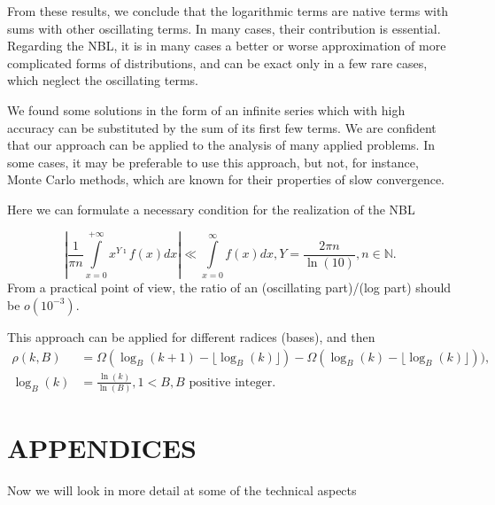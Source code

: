 \documentclass[titlepage,fleqn]{article}%
\providecommand{\U}[1]{\protect\rule{.1in}{.1in}}
\begin{document}
From these results, we conclude that the logarithmic terms are native terms
with sums with other oscillating terms. In many cases, their contribution is
essential. Regarding the NBL, it is in many cases a better or worse
approximation of more complicated forms of distributions, and can be exact
only in a few rare cases, which neglect the oscillating terms.

We found some solutions in the form of an infinite series which with high
accuracy can be substituted by the sum of its first few terms. We are
confident that our approach can be applied to the analysis of many applied
problems. In some cases, it may be preferable to use this approach, but not,
for instance, Monte Carlo methods, which are known for their properties of
slow convergence.

Here we can formulate a necessary condition for the realization of the NBL%

\begin{equation}
\left\vert \frac{1}{\pi n}%
{\displaystyle\int\limits_{x=0}^{+\infty}}
x^{Y\imath}f(x)dx\right\vert \ll%
{\displaystyle\int\limits_{x=0}^{\infty}}
f(x)dx,Y=\frac{2\pi n}{\ln(10)},n\in%
\mathbb{N}
.\label{NBLcond}%
\end{equation}
From a practical point of view, the ratio of an (oscillating part)/(log part)
should be $o(10^{-3}).$

This approach can be applied for different radices (bases), and then%
\begin{align*}
\rho(k,B)  &  =\Omega(\log_{B}(k+1)-\lfloor\log_{B}(k)\rfloor)-\Omega\left(
\log_{B}(k)-\lfloor\log_{B}(k)\rfloor\right)  ),\\
\log_{B}(k)  &  =\frac{\ln(k)}{\ln(B)},1<B,B\text{ positive integer.}%
\end{align*}
%

\section*{APPENDICES}%
%

Now we will look in more detail at some of the technical aspects%
%
\end{document}
